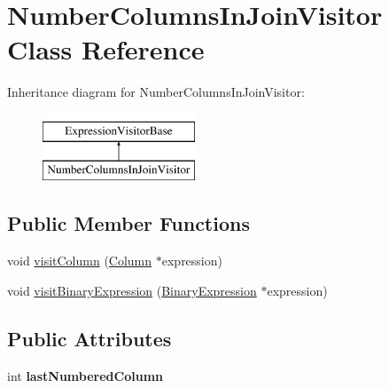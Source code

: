 \hypertarget{class_number_columns_in_join_visitor}{\section{Number\+Columns\+In\+Join\+Visitor Class Reference}
\label{class_number_columns_in_join_visitor}
}
Inheritance diagram for Number\+Columns\+In\+Join\+Visitor\+:\begin{figure}[H]
\begin{center}
\leavevmode
\includegraphics[height=2.000000cm]{class_number_columns_in_join_visitor}
\end{center}
\end{figure}
\subsection*{Public Member Functions}
\begin{DoxyCompactItemize}
\item 
void \hyperlink{class_number_columns_in_join_visitor_ac3b174509ec5ec5310ef73e47aa59694}{visit\+Column} (\hyperlink{class_column}{Column} $\ast$expression)
\item 
void \hyperlink{class_number_columns_in_join_visitor_a857c2d096fe87b1ac98ea50922d1c958}{visit\+Binary\+Expression} (\hyperlink{class_binary_expression}{Binary\+Expression} $\ast$expression)
\end{DoxyCompactItemize}
\subsection*{Public Attributes}
\begin{DoxyCompactItemize}
\item 
\hypertarget{class_number_columns_in_join_visitor_af26374a4ce48016848edd71c935f92a3}{int {\bfseries last\+Numbered\+Column}}\label{class_number_columns_in_join_visitor_af26374a4ce48016848edd71c935f92a3}

\end{DoxyCompactItemize}


